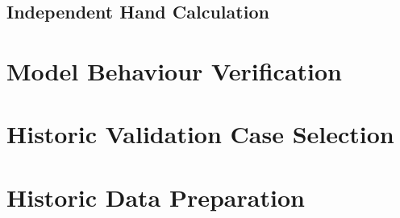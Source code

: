 \subsection{Independent Hand Calculation}

\section{Model Behaviour Verification}
\label{sec:model-behaviour-verification}


\section{Historic Validation Case Selection}
\label{sec:case-selection}


\section{Historic Data Preparation}
\label{sec:validation-data-prep}


